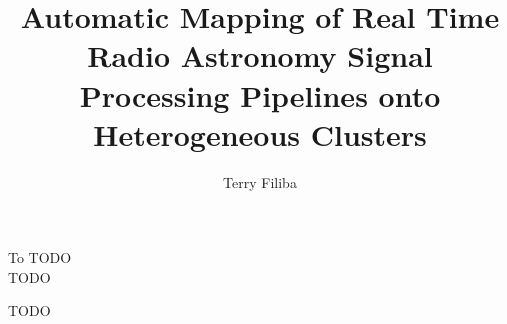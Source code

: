 \documentclass{ucbthesis}
\begin{document}

\title{Automatic Mapping of Real Time Radio Astronomy Signal Processing Pipelines onto Heterogeneous Clusters}
\author{Terry Filiba}




\maketitle
\approvalpage
\copyrightpage



\begin{frontmatter}

\begin{dedication}
\null\vfil
\begin{center}
To TODO\\\vspace{12pt}
TODO
\end{center}
\vfil\null
\end{dedication}

\tableofcontents
\clearpage
\listoffigures
\clearpage
\listoftables

\begin{acknowledgements}
TODO
\end{acknowledgements}

\end{frontmatter}

\pagestyle{headings}





\printbibliography
\end{document}

